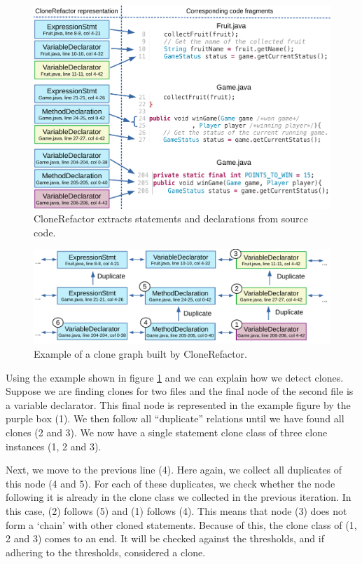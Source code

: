\begin{figure}[H]
  \centering
  \includegraphics[width=1\columnwidth]{img/CloneGraphCode}
  \caption{CloneRefactor extracts statements and declarations from source code.}
  \label{fig:clonegraph}
\end{figure}

\begin{figure}[H]
  \centering
  \includegraphics[width=1\columnwidth]{img/CodeGraphExample}
  \caption{Example of a clone graph built by CloneRefactor.}
  \label{fig:clonegraph2}
\end{figure}

Using the example shown in figure \ref{fig:clonegraph} and \label{fig:clonegraph2} we can explain how we detect clones. Suppose we are finding clones for two files and the final node of the second file is a variable declarator. This final node is represented in the example figure by the purple box (1). We then follow all ``duplicate'' relations until we have found all clones (2 and 3). We now have a single statement clone class of three clone instances (1, 2 and 3).

Next, we move to the previous line (4). Here again, we collect all duplicates of this node (4 and 5). For each of these duplicates, we check whether the node following it is already in the clone class we collected in the previous iteration. In this case, (2) follows (5) and (1) follows (4). This means that node (3) does not form a `chain' with other cloned statements. Because of this, the clone class of (1, 2 and 3) comes to an end. It will be checked against the thresholds, and if adhering to the thresholds, considered a clone.

